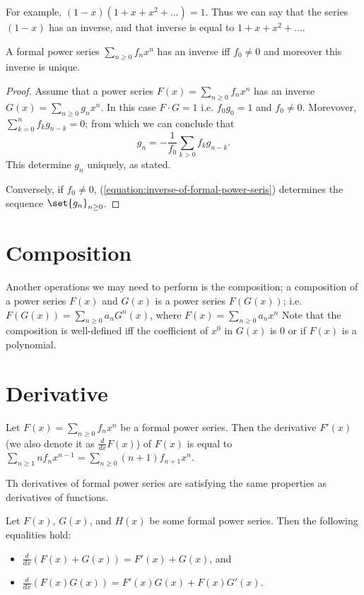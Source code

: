 For example, $(1 - x) (1 + x + x^2 + \dots) = 1$. Thus we can say that the
series $(1 - x)$ has an inverse, and that inverse is equal to $1 + x + x^2 +
\dots$.
\begin{theorem}
  A formal power series $\sum_{n \ge 0} f_n x^n$ has an inverse iff
  $f_0 \neq 0$ and moreover this inverse is unique.
\end{theorem}
\begin{proof}
  Assume that a power series $F(x) = \sum_{n \ge 0} f_n x^n$ has an inverse
  $G(x) = \sum_{n \ge 0} g_n x^n$. In this case $F \cdot G = 1$ i.e.
  $f_0 g_0 = 1$ and $f_0 \neq 0$. Morevover,
  $\sum_{k = 0}^n f_k g_{n - k} = 0$; from which we can conclude that
  \begin{equation}
    \label{equation:inverse-of-formal-power-series}
    g_n = -\frac{1}{f_0} \sum_{k > 0} f_k g_{n - k}.
  \end{equation}
  This determine $g_n$ uniquely, as stated.

  Conversely, if $f_0 \neq 0$, (\ref{equation:inverse-of-formal-power-seris})
  determines the sequence $\set{g_n}_{n \ge 0}$.
\end{proof}

\section{Composition}
Another operations we may need to perform is the composition; a composition of
a power series $F(x)$ and $G(x)$ is a power series $F(G(x))$; i.e.
$F(G(x)) = \sum_{n \ge 0} a_n G^n(x)$, where $F(x) = \sum_{n \ge 0} a_n x^n$
Note that the composition is well-defined iff the coefficient of $x^0$ in $G(x)$
is $0$ or if $F(x)$ is a polynomial.

\section{Derivative}
Let $F(x) = \sum_{n \ge 0} f_n x^n$ be a formal power series. Then the
derivative $F'(x)$ (we also denote it as $\frac{d}{dx} F(x)$) of $F(x)$ is
equal to
$\sum_{n \ge 1} n f_n x^{n - 1} = \sum_{n \ge 0} (n + 1) f_{n + 1} x^n$.

Th derivatives of formal power series are satisfying the same properties as
derivatives of functions.
\begin{theorem}
  Let $F(x)$, $G(x)$, and $H(x)$ be some formal power series. Then the following
  equalities hold:
  \begin{itemize}
    \item $\frac{d}{dx}(F(x) + G(x)) = F'(x) + G(x)$, and
    \item $\frac{d}{dx}(F(x) G(x)) = F'(x)G(x) + F(x)G'(x)$.
  \end{itemize}
\end{theorem}


